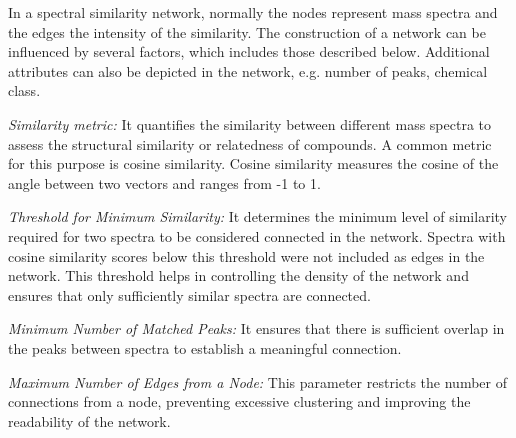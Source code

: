 In a spectral similarity network, normally the nodes represent mass spectra and the edges the intensity of the similarity. The construction of a network can be influenced by several factors, which includes those described below. Additional attributes can also be depicted in the network, e.g. number of peaks, chemical class.

\textit{Similarity metric:} It quantifies the similarity between different mass spectra to assess the structural similarity or relatedness of compounds. A common metric for this purpose is cosine similarity. Cosine similarity measures the cosine of the angle between two vectors and ranges from -1 to 1.

\textit{Threshold for Minimum Similarity:} It determines the minimum level of similarity required for two spectra to be considered connected in the network. Spectra with cosine similarity scores below this threshold were not included as edges in the network. This threshold helps in controlling the density of the network and ensures that only sufficiently similar spectra are connected.

\textit{Minimum Number of Matched Peaks:} It ensures that there is sufficient overlap in the peaks between spectra to establish a meaningful connection. 

\textit{Maximum Number of Edges from a Node:} This parameter restricts the number of connections from a node, preventing excessive clustering and improving the readability of the network.
